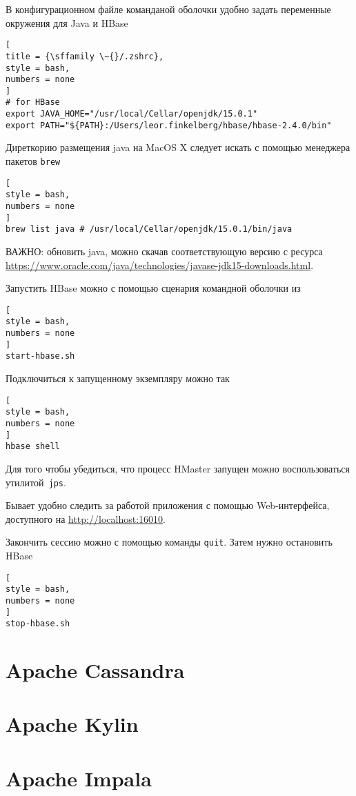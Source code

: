 \documentclass[%
	11pt,
	a4paper,
	utf8,
		]{article}
\begin{document}
В конфигурационном файле команданой оболочки удобно задать переменные окружения для Java и HBase
\begin{lstlisting}[
title = {\sffamily \~{}/.zshrc},
style = bash,
numbers = none	
]
# for HBase
export JAVA_HOME="/usr/local/Cellar/openjdk/15.0.1"
export PATH="${PATH}:/Users/leor.finkelberg/hbase/hbase-2.4.0/bin"
\end{lstlisting}

Диреткорию размещения java на MacOS X следует искать с помощью менеджера пакетов \texttt{brew}
\begin{lstlisting}[
style = bash,
numbers = none
]
brew list java # /usr/local/Cellar/openjdk/15.0.1/bin/java
\end{lstlisting}

ВАЖНО: обновить java, можно скачав соответствующую версию с ресурса \url{https://www.oracle.com/java/technologies/javase-jdk15-downloads.html}.

Запустить HBase можно с помощью сценария командной оболочки из 
\begin{lstlisting}[
style = bash,
numbers = none	
]
start-hbase.sh
\end{lstlisting}

Подключиться к запущенному экземпляру можно так
\begin{lstlisting}[
style = bash,
numbers = none	
]
hbase shell
\end{lstlisting}

Для того чтобы убедиться, что процесс HMaster запущен можно воспользоваться утилитой~\texttt{jps}.

Бывает удобно следить за работой приложения с помощью Web-интерфейса, доступного на \url{http://localhost:16010}.

Закончить сессию можно с помощью команды \texttt{quit}. Затем нужно остановить HBase
\begin{lstlisting}[
style = bash,
numbers = none
]
stop-hbase.sh
\end{lstlisting}


\section{Apache Cassandra}

\section{Apache Kylin}


\section{Apache Impala}
\end{document}
